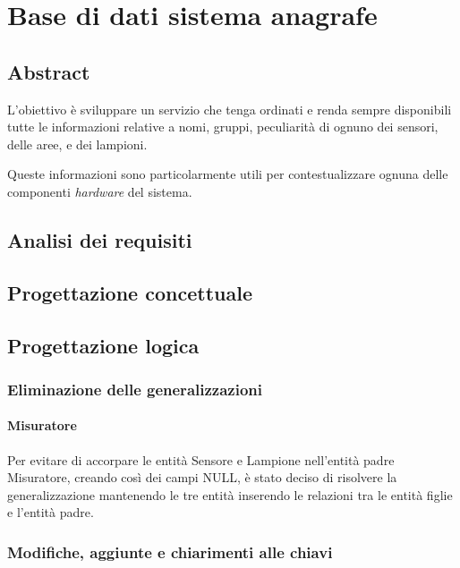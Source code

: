 \section{Base di dati sistema anagrafe}

\subsection{Abstract}

L'obiettivo è sviluppare un servizio che tenga ordinati e renda sempre disponibili tutte le informazioni relative a nomi, gruppi, peculiarità di ognuno dei sensori, delle aree, e dei lampioni. 

Queste informazioni sono particolarmente utili per contestualizzare ognuna delle componenti {\it{hardware}} del sistema.

\subsection{Analisi dei requisiti}

\subsection{Progettazione concettuale}

\subsection{Progettazione logica}

\subsubsection{Eliminazione delle generalizzazioni}

\paragraph{Misuratore}

Per evitare di accorpare le entità Sensore e Lampione nell'entità padre Misuratore, creando così dei campi NULL, è stato deciso di risolvere la generalizzazione mantenendo le tre entità inserendo le relazioni tra le entità figlie e l'entità padre.

\subsubsection{Modifiche, aggiunte e chiarimenti alle chiavi}

